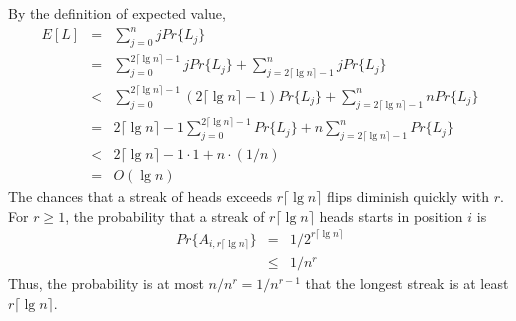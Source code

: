 \documentclass[12pt]{article}
\begin{document}
By the definition of expected value,
\begin{eqnarray*}
  E[L]
  &=& \sum_{j=0}^{n} j Pr \{ L_j \} \\
  &=& \sum_{j=0}^{2 \lceil \lg n \rceil - 1} j Pr \{ L_j \}
      + \sum_{j = 2 \lceil \lg n \rceil - 1}^{n} j Pr \{ L_j \} \\
  &<& \sum_{j=0}^{2 \lceil \lg n \rceil - 1} (2 \lceil \lg n \rceil - 1)
      Pr \{ L_j \} + \sum_{j = 2 \lceil \lg n \rceil - 1}^{n} n Pr \{ L_j \} \\
  &=& 2 \lceil \lg n \rceil - 1 \sum_{j=0}^{2 \lceil \lg n \rceil - 1} 
      Pr \{ L_j \} + n \sum_{j = 2 \lceil \lg n \rceil - 1}^{n} Pr \{ L_j \} \\
  &<& 2 \lceil \lg n \rceil - 1 \cdot 1 + n \cdot (1/n) \\
  &=& O(\lg n)
\end{eqnarray*}
The chances that a streak of heads exceeds $r \lceil \lg n \rceil$ flips diminish quickly with $r$. For $r \ge 1$, the probability that a streak of $r \lceil \lg n \rceil$ heads starts in position $i$ is
\begin{eqnarray*}
  Pr \{ A_{i, r \lceil \lg n \rceil} \}
  &=& 1 / 2^{r \lceil \lg n \rceil} \\
  &\le& 1 / n^r
\end{eqnarray*}
Thus, the probability is at most $n / n^r = 1 / n^{r-1}$ that the longest streak is at least $r \lceil \lg n \rceil$. \\
\end{document}
